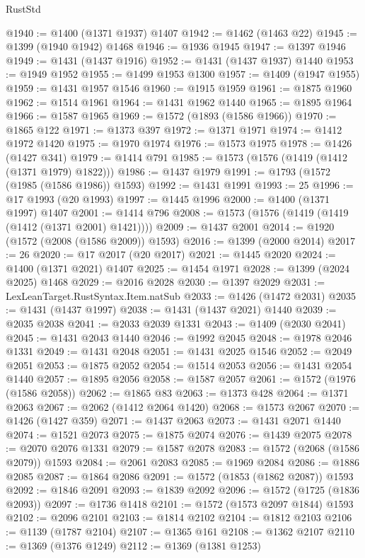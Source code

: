 \begin{lexlean}{RustStd}
\begin{coremodule}
@1940 := @1400 (@1371 @1937) @1407
@1942 := @1462 (@1463 @22)
@1945 := @1399 (@1940 @1942) @1468
@1946 := @1936 @1945
@1947 := @1397 @1946
@1949 := @1431 (@1437 @1916)
@1952 := @1431 (@1437 @1937) @1440
@1953 := @1949 @1952
@1955 := @1499 @1953 @1300
@1957 := @1409 (@1947 @1955)
@1959 := @1431 @1957 @1546
@1960 := @1915 @1959
@1961 := @1875 @1960
@1962 := @1514 @1961
@1964 := @1431 @1962 @1440
@1965 := @1895 @1964
@1966 := @1587 @1965
@1969 := @1572 (@1893 (@1586 @1966))
@1970 := @1865 @122
@1971 := @1373 @397
@1972 := @1371 @1971
@1974 := @1412 @1972 @1420
@1975 := @1970 @1974
@1976 := @1573 @1975
@1978 := @1426 (@1427 @341)
@1979 := @1414 @791
@1985 := @1573 (@1576 (@1419 (@1412 (@1371 @1979) @1822)))
@1986 := @1437 @1979
@1991 := @1793 (@1572 (@1985 (@1586 @1986)) @1593)
@1992 := @1431 @1991
@1993 := 25
@1996 := @17 @1993 (@20 @1993)
@1997 := @1445 @1996
@2000 := @1400 (@1371 @1997) @1407
@2001 := @1414 @796
@2008 := @1573 (@1576 (@1419 (@1419 (@1412 (@1371 @2001) @1421))))
@2009 := @1437 @2001
@2014 := @1920 (@1572 (@2008 (@1586 @2009)) @1593)
@2016 := @1399 (@2000 @2014)
@2017 := 26
@2020 := @17 @2017 (@20 @2017)
@2021 := @1445 @2020
@2024 := @1400 (@1371 @2021) @1407
@2025 := @1454 @1971
@2028 := @1399 (@2024 @2025) @1468
@2029 := @2016 @2028
@2030 := @1397 @2029
@2031 := LexLeanTarget.RustSyntax.Item.natSub
@2033 := @1426 (@1472 @2031)
@2035 := @1431 (@1437 @1997)
@2038 := @1431 (@1437 @2021) @1440
@2039 := @2035 @2038
@2041 := @2033 @2039 @1331
@2043 := @1409 (@2030 @2041)
@2045 := @1431 @2043 @1440
@2046 := @1992 @2045
@2048 := @1978 @2046 @1331
@2049 := @1431 @2048
@2051 := @1431 @2025 @1546
@2052 := @2049 @2051
@2053 := @1875 @2052
@2054 := @1514 @2053
@2056 := @1431 @2054 @1440
@2057 := @1895 @2056
@2058 := @1587 @2057
@2061 := @1572 (@1976 (@1586 @2058))
@2062 := @1865 @83
@2063 := @1373 @428
@2064 := @1371 @2063
@2067 := @2062 (@1412 @2064 @1420)
@2068 := @1573 @2067
@2070 := @1426 (@1427 @359)
@2071 := @1437 @2063
@2073 := @1431 @2071 @1440
@2074 := @1521 @2073
@2075 := @1875 @2074
@2076 := @1439 @2075
@2078 := @2070 @2076 @1331
@2079 := @1587 @2078
@2083 := @1572 (@2068 (@1586 @2079)) @1593
@2084 := @2061 @2083
@2085 := @1969 @2084
@2086 := @1886 @2085
@2087 := @1864 @2086
@2091 := @1572 (@1853 (@1862 @2087)) @1593
@2092 := @1846 @2091
@2093 := @1839 @2092
@2096 := @1572 (@1725 (@1836 @2093))
@2097 := @1736 @1418
@2101 := @1572 (@1573 @2097 @1844) @1593
@2102 := @2096 @2101
@2103 := @1814 @2102
@2104 := @1812 @2103
@2106 := @1139 (@1787 @2104)
@2107 := @1365 @161
@2108 := @1362 @2107
@2110 := @1369 (@1376 @1249)
@2112 := @1369 (@1381 @1253)

\end{coremodule}
\end{lexlean}
